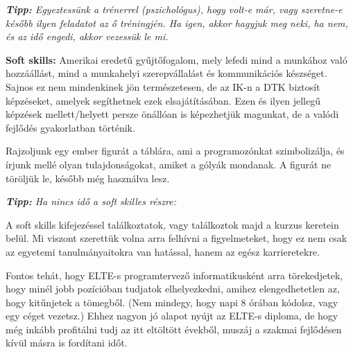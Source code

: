 \documentclass[../Main.tex]{subfiles}
\begin{document}
\textit{\textbf{Tipp:}
Egyeztessünk a trénerrel (pszichológus), hogy volt-e már, vagy szeretne-e később ilyen feladatot az ő tréningjén.
Ha igen, akkor hagyjuk meg neki, ha nem, és az idő engedi, akkor vezessük le mi.
}

\textbf{Soft skills:}
Amerikai eredetű gyűjtőfogalom, mely lefedi mind a munkához való hozzáállást, mind a munkahelyi szerepvállalást és kommunikációs készséget.
Sajnos ez nem mindenkinek jön természetesen, de az IK-n a DTK biztosít képzéseket, amelyek segíthetnek ezek elsajátításában.
Ezen és ilyen jellegű képzések mellett/helyett persze önállóan is képezhetjük magunkat, de a valódi fejlődés gyakorlatban történik.

Rajzoljunk egy ember figurát a táblára, ami a programozónkat szimbolizálja, és írjunk mellé olyan tulajdonságokat, amiket a gólyák mondanak.
A figurát ne töröljük le, később még használva lesz.


\textit{\textbf{Tipp:}
Ha nincs idő a soft skilles részre:
}

A soft skills kifejezéssel találkoztatok, vagy találkoztok majd a kurzus keretein belül.
Mi viszont szerettük volna arra felhívni a figyelmeteket, hogy ez nem csak az egyetemi tanulmányaitokra van hatással, hanem az egész karrieretekre.

Fontos tehát, hogy ELTE-s programtervező informatikusként arra törekedjetek, hogy minél jobb pozícióban tudjatok elhelyezkedni, amihez elengedhetetlen az, hogy kitűnjetek a tömegből.
(Nem mindegy, hogy napi 8 órában kódolsz, vagy egy céget vezetsz.)
Ehhez nagyon jó alapot nyújt az ELTE-s diploma, de hogy még inkább profitálni tudj az itt eltöltött évekből, muszáj a szakmai fejlődésen kívül másra is fordítani időt.
\end{document}
